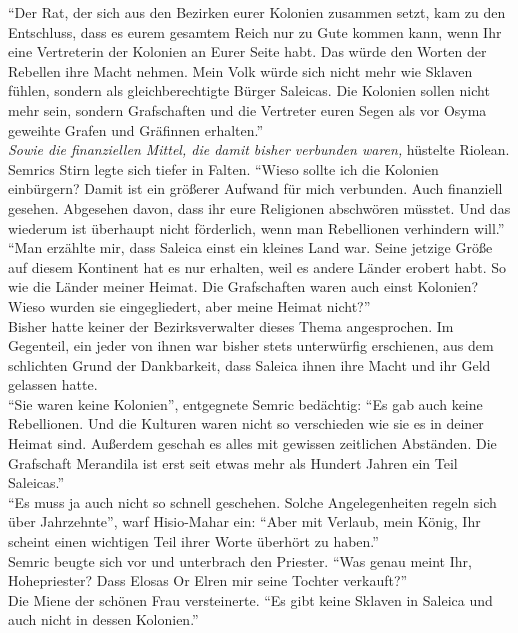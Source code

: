 ``Der Rat, der sich aus den Bezirken eurer Kolonien zusammen setzt, kam zu den Entschluss, dass es 
eurem gesamtem Reich nur zu Gute kommen kann, wenn Ihr eine Vertreterin der Kolonien an Eurer Seite 
habt. Das würde den Worten der Rebellen ihre Macht nehmen. Mein Volk würde sich nicht mehr wie 
Sklaven fühlen, sondern als gleichberechtigte Bürger Saleicas. Die Kolonien sollen nicht mehr 
sein, sondern Grafschaften und die Vertreter euren Segen als vor Osyma geweihte Grafen und 
Gräfinnen erhalten.''\\
\textit{Sowie die finanziellen Mittel, die damit bisher verbunden waren,} hüstelte Riolean.\\
Semrics Stirn legte sich tiefer in Falten. ``Wieso sollte ich die Kolonien einbürgern? Damit ist 
ein größerer Aufwand für mich verbunden. Auch finanziell gesehen. Abgesehen davon, dass ihr eure 
Religionen abschwören müsstet. Und das wiederum ist überhaupt nicht förderlich, wenn man 
Rebellionen verhindern will.''\\
``Man erzählte mir, dass Saleica einst ein kleines Land war. Seine jetzige Größe auf diesem 
Kontinent hat es nur erhalten, weil es andere Länder erobert habt. So wie die Länder meiner Heimat. 
Die Grafschaften waren auch einst Kolonien? Wieso wurden sie eingegliedert, aber meine Heimat 
nicht?''\\
Bisher hatte keiner der Bezirksverwalter dieses Thema angesprochen. Im Gegenteil, ein jeder von 
ihnen war bisher stets unterwürfig erschienen, aus dem schlichten Grund der Dankbarkeit, dass 
Saleica ihnen ihre Macht und ihr Geld gelassen hatte.\\
``Sie waren keine Kolonien'', entgegnete Semric bedächtig: ``Es gab auch keine Rebellionen. Und die 
Kulturen waren nicht so verschieden wie sie es in deiner Heimat sind. Außerdem geschah es alles mit 
gewissen zeitlichen Abständen. Die Grafschaft Merandila ist erst seit etwas mehr als Hundert Jahren 
ein Teil Saleicas.''\\
``Es muss ja auch nicht so schnell geschehen. Solche Angelegenheiten regeln sich über Jahrzehnte'', 
warf Hisio-Mahar ein: ``Aber mit Verlaub, mein König, Ihr scheint einen wichtigen Teil ihrer Worte 
überhört zu haben.''\\
Semric beugte sich vor und unterbrach den Priester. ``Was genau meint Ihr, Hohepriester? Dass 
Elosas Or Elren mir seine Tochter verkauft?''\\
Die Miene der schönen Frau versteinerte. ``Es gibt keine Sklaven in Saleica und auch nicht in 
dessen Kolonien.''\\
